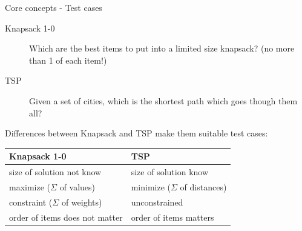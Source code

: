 \documentclass{beamer}
\begin{document}
\begin{frame}{Core concepts - Test cases}
  \begin{description}
    \item[Knapsack 1-0] Which are the best items to put into a limited size knapsack? (no more than 1 of each item!)
    \item[TSP] Given a set of cities, which is the shortest path which goes though them all?
  \end{description}
  Differences between Knapsack and TSP make them suitable test cases:
  \begin{center}
    \begin{tabular}{||l|l||}
      \hline
      Knapsack 1-0                     & TSP\\
      \hline
      \hline
      size of solution not know        & size of solution know\\
      \hline
      maximize ($\Sigma$ of values)    & minimize ($\Sigma$ of distances)\\
      \hline
      constraint ($\Sigma$ of weights) & unconstrained\\
      \hline
      order of items does not matter   & order of items matters\\
      \hline
    \end{tabular}
  \end{center}
\end{frame}




\end{document}
